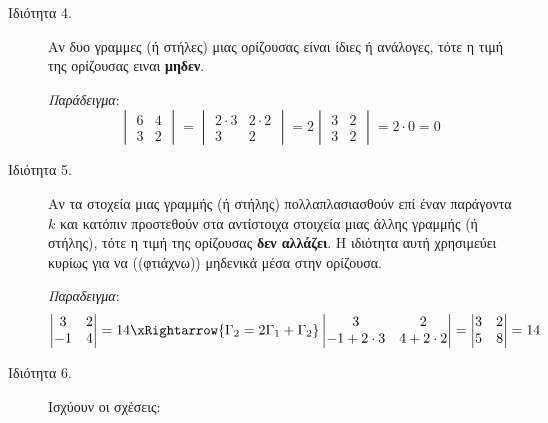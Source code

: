 \begin{description}
    \item[Ιδιότητα 4.] Αν δυο γραμμες (ή στήλες) μιας ορίζουσας είναι ίδιες ή ανάλογες, τότε η τιμή της ορίζουσας ειναι \textbf{μηδεν}.

        \textit{Παράδειγμα}: 
        \[
            \begin{vmatrix}
                6 & 4\\
                3 & 2 
                \end{vmatrix} = \begin{vmatrix}
                2\cdot 3 & 2\cdot 2\\
                3 & 2 
                \end{vmatrix} = 2\begin{vmatrix}
                3 & 2 \\
                3 & 2 
            \end{vmatrix}=2\cdot 0 = 0
        \]



    \item[Ιδιότητα 5.] Αν τα στοχεία μιας γραμμής (ή στήλης) πολλαπλασιασθούν επί έναν παράγοντα $k$ και κατόπιν προστεθούν στα αντίστοιχα στοιχεία μιας άλλης γραμμής (ή στήλης), τότε η τιμή της ορίζουσας \textbf{δεν αλλάζει}. Η ιδιότητα αυτή χρησιμεύει κυρίως για να ((φτιάχνω)) μηδενικά μέσα στην ορίζουσα.

        \textit{Παραδειγμα}:
        \[
            \begin{vmatrix}
                3 & 2\\
                -1 & 4
            \end{vmatrix}=14
            \xRightarrow{\Gamma_2=2\Gamma_1+\Gamma_2}\begin{vmatrix}
                3 & 2 \\
                -1 + 2\cdot 3 & 4 + 2\cdot 2 
                \end{vmatrix}=\begin{vmatrix}
                3 & 2\\
                5 & 8 
            \end{vmatrix}=14
        \]

    \item[Ιδιότητα 6.] Ισχύουν οι σχέσεις:
        \begin{enumerate}[i)]


\end{enumerate}
\end{description}
